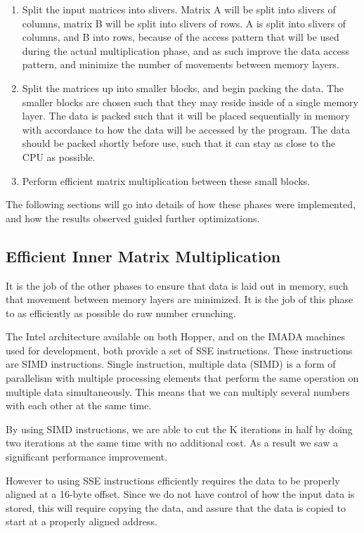 \documentclass[a4paper.11pt,oneside]{book}
\begin{document}
\begin{enumerate}
  \item Split the input matrices into slivers. Matrix A will be split into 
  slivers of columns, matrix B will be split into slivers of rows. A is split
  into slivers of columns, and B into rows, because of the access pattern that
  will be used during the actual multiplication phase, and as such improve the
  data access pattern, and minimize the number of movements between memory
  layers.
  \item Split the matrices up into smaller blocks, and begin packing the data.
  The smaller blocks are chosen such that they may reside inside of a single
  memory layer. The data is packed such that it will be placed sequentially in
  memory with accordance to how the data will be accessed by the program. 
  The data should be packed shortly before use, such that it can stay as close 
  to the CPU as possible.
  \item Perform efficient matrix multiplication between these small blocks.
\end{enumerate}

The following sections will go into details of how these phases were
implemented, and how the results observed guided further optimizations.

\subsection{Efficient Inner Matrix Multiplication}

It is the job of the other phases to ensure that data is laid out in memory,
such that movement between memory layers are minimized. It is the job of this
phase to as efficiently as possible do raw number crunching.

The Intel architecture available on both Hopper, and on the IMADA machines used
for development, both provide a set of SSE instructions. These instructions are
SIMD instructions. Single instruction, multiple data (SIMD) is a form of
parallelism with multiple processing elements that perform the same operation on
multiple data simultaneously. This means that we can multiply several numbers
with each other at the same time. 

By using SIMD instructions, we are able to cut the K iterations in half by doing
two iterations at the same time with no additional cost. As a result we saw a
significant performance improvement. 

However to using SSE instructions efficiently requires the data to be properly
aligned at a 16-byte offset. Since we do not have control of how the input data
is stored, this will require  copying the data, and assure that the data is
copied to start at a properly  aligned address.
\end{document}
